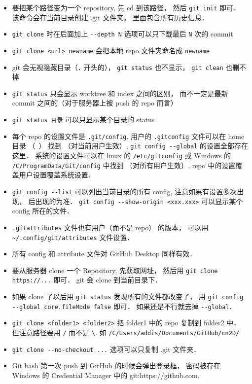 \begin{itemize}
\item 要把某个路径变为一个 repository, 先 cd 到该路径， 然后 \verb|git init| 即可． 该命令会在当前目录创建 .git 文件夹， 里面包含所有历史信息．
\item \verb|git clone| 时在后面加上 \verb|--depth N| 选项可以只下载最后 \verb|N| 次的 commit
\item \verb|git clone <url> newname| 会把本地 repo 文件夹命名成 \verb|newname|
\item git 会无视隐藏目录（\verb|.| 开头的）， \verb|git status| 也不显示， \verb|git clean| 也删不掉
\item \verb|git status| 只会显示 worktree 和 index 之间的区别， 而不一定是最新 commit 之间的（对于服务器上被 push 的 repo 而言）
\item \verb|git status 目录| 可以只显示某个目录的 status
\item 每个 repo 的设置文件是 \verb|.git/config|. 用户的 \verb|.gitconfig| 文件可以在 home 目录 （~） 找到 （对当前用户生效）, \verb|git config --global| 的设置全部存在这里． 系统的设置文件可以在 linux 的 \verb|/etc/gitconfig| 或 Windows 的 \verb|/C/ProgramData/Git/config| 中找到 （对所有用户生效）. repo 中的设置覆盖用户设置覆盖系统设置．
\item \verb|git config --list| 可以列出当前目录的所有 config, 注意如果有设置多次出现， 后出现的为准． \verb|git config --show-origin <xxx.xxx>| 可以显示某个 config 所在的文件．
\item \verb|.gitattributes| 文件也有用户（而不是 repo） 的版本， 可以用 \verb|~/.config/git/attributes| 文件设置．
\item 所有 config 和 attribute 文件对 GitHub Desktop 同样有效．
\item 要从服务器 clone 一个 Repository, 先获取网址， 然后用 \verb|git clone https://...| 即可． git 会 clone 到当前目录下．
\item 如果 clone 了以后用 \verb|git status| 发现所有的文件都改变了， 用 \verb|git config --global core.fileMode false| 即可． 如果还是不行就去掉 \verb|--global|．
\item \verb|git clone <folder1> <folder2>| 把 folder1 中的 repo 复制到 folder2 中． 但注意路径要用 \verb|/| 而不是 \verb|\|. 如 \verb|/C/Users/addis/Documents/GitHub/cn2D/|
\item \verb|git clone --no-checkout ...| 选项可以只复制 .git 文件夹．
\item Git bash 第一次 push 到 GitHub 的时候会弹出登录框， 密码被存在 Windows 的 Credential Manager 中的 git:https://github.com.

\end{itemize}
